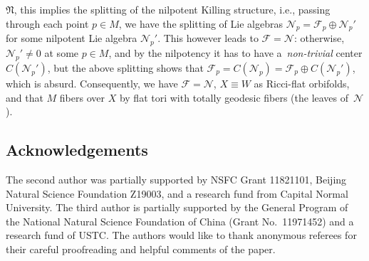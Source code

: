 \documentclass[pdftex]{sigma}
\numberwithin{equation}{section}
\begin{document}
 $\mathfrak{N}$, this implies the splitting of the nilpotent Killing structure,
 i.e., passing through each point $p\in M$, we have the splitting of Lie algebras
 $\mathcal{N}_p=\mathcal{F}_p\oplus \mathcal{N}_p'$ for some nilpotent Lie
 algebra $\mathcal{N}_p'$. This however leads to $\mathcal{F}=\mathcal{N}$:
 otherwise, $\mathcal{N}_p'\not= 0$ at some $p\in M$, and by the nilpotency it
 has to have a~\emph{non-trivial} center $C(\mathcal{N}_p')$, but the above
 splitting shows that $\mathcal{F}_p =C(\mathcal{N}_p)=\mathcal{F}_p\oplus
 C(\mathcal{N}_p')$, which is absurd. Consequently, we have
 $\mathcal{F}=\mathcal{N}$, $X\equiv W$ as Ricci-flat orbifolds, and that
 $M$ fibers over $X$ by flat tori with totally geodesic fibers (the leaves of~$\mathcal{N}$).

\subsection*{Acknowledgements}
The second author was partially supported by NSFC Grant 11821101, Beijing
Natural Science Foundation Z19003, and a research fund from Capital Normal
University. The third author is partially supported by the General Program of
the National Natural Science Foundation of China (Grant No.~11971452) and a
research fund of USTC. The authors would like to thank anonymous referees for
their careful proofreading and helpful comments of the paper.
\end{document}
